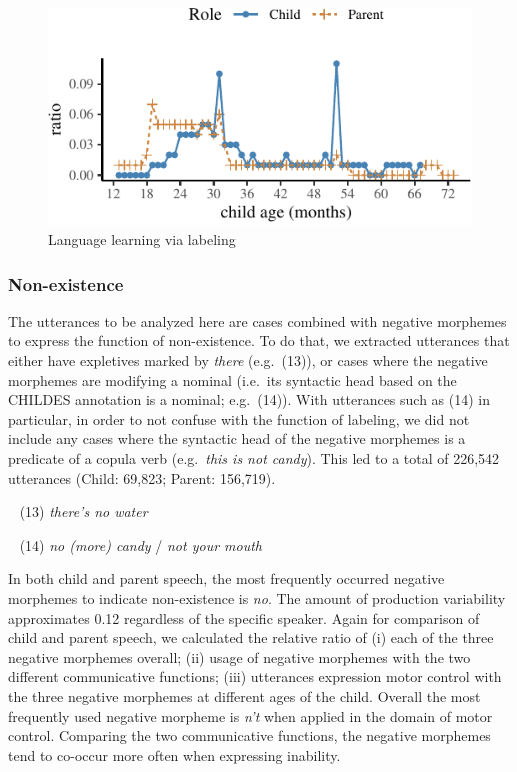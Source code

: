 \documentclass[10pt, letterpaper]{article}
\newenvironment{CodeChunk}{}{}
\begin{document}
\begin{CodeChunk}
\begin{figure}[H]

{\centering \includegraphics{figs/learning-1} 

}

\caption[Language learning via labeling]{Language learning via labeling}\label{fig:learning}
\end{figure}
\end{CodeChunk}

\hypertarget{non-existence}{%
\subsubsection{Non-existence}\label{non-existence}}

The utterances to be analyzed here are cases combined with negative
morphemes to express the function of non-existence. To do that, we
extracted utterances that either have expletives marked by \emph{there}
(e.g.~(13)), or cases where the negative morphemes are modifying a
nominal (i.e.~its syntactic head based on the CHILDES annotation is a
nominal; e.g.~(14)). With utterances such as (14) in particular, in
order to not confuse with the function of labeling, we did not include
any cases where the syntactic head of the negative morphemes is a
predicate of a copula verb (e.g.~\emph{this is not candy}). This led to
a total of 226,542 utterances (Child: 69,823; Parent: 156,719).

~ (13) \emph{there's no water}

~ (14) \emph{no (more) candy} / \emph{not your mouth}

In both child and parent speech, the most frequently occurred negative
morphemes to indicate non-existence is \emph{no}. The amount of
production variability approximates 0.12 regardless of the specific
speaker. Again for comparison of child and parent speech, we calculated
the relative ratio of (i) each of the three negative morphemes overall;
(ii) usage of negative morphemes with the two different communicative
functions; (iii) utterances expression motor control with the three
negative morphemes at different ages of the child. Overall the most
frequently used negative morpheme is \emph{n't} when applied in the
domain of motor control. Comparing the two communicative functions, the
negative morphemes tend to co-occur more often when expressing
inability.
\end{document}
